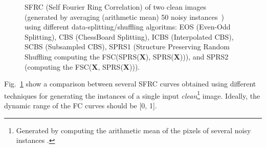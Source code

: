 \documentclass{article}
\begin{document}
\begin{figure}
  \centering
  \caption{SFRC (Self Fourier Ring Correlation) of two clean images
    (generated by averaging (arithmetic mean) 50 noisy
    instances~\cite{zhang2019poisson}) using different
    data-splitting/shuffling algoritms: EOS (Even-Odd Splitting), CBS
    (ChessBoard Splitting), ICBS (Interpolated CBS), SCBS (Subsampled
    CBS), SPRS1 (Structure Preserving Random Shuffling computing the
    FSC(SPRS($\mathbf{X}$), SPRS($\mathbf{X}$))), and
    SPRS2 (computing the FSC($\mathbf{X}$,
    SPRS($\mathbf{X}$))).\label{fig:SFC_vs_splitting_clean}}
\end{figure}

Fig.~\ref{fig:SFC_vs_splitting_clean} show a comparison between
several SFRC curves obtained using different techniques for generating
the instances of a single input \emph{clean}\footnote{Generated by
  computing the arithmetic mean of the pixels of several noisy
  instances \cite{zhang2019poisson}.} image.  Ideally, the dynamic
range of the FC curves should be [0, 1].
\end{document}
